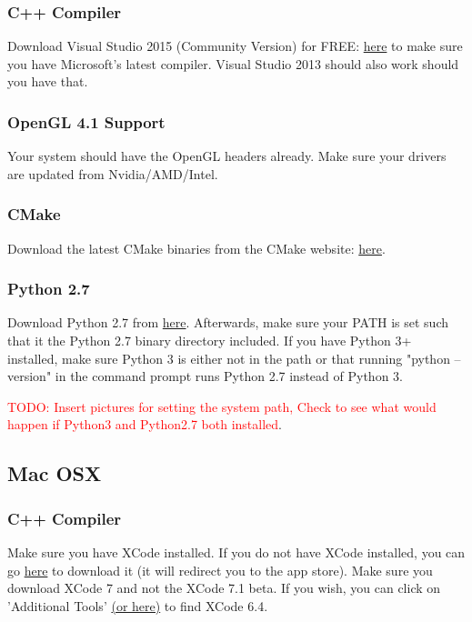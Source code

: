 \documentclass{article}
\begin{document}
\subsubsection*{C++ Compiler}

Download Visual Studio 2015 (Community Version) for FREE: \href{https://www.visualstudio.com/en-us/products/vs-2015-product-editions.aspx}{here} to make sure you have Microsoft's latest compiler.  Visual Studio 2013 should also work should you have that.

\subsubsection*{OpenGL 4.1 Support}

Your system should have the OpenGL headers already. Make sure your drivers are updated from Nvidia/AMD/Intel.

\subsubsection*{CMake}

Download the latest CMake binaries from the CMake website: \href{http://www.cmake.org/download/}{here}.

\subsubsection*{Python 2.7}

Download Python 2.7 from \href{https://www.python.org/download/releases/2.7/}{here}. Afterwards, make sure your PATH is set such that it the Python 2.7 binary directory included. If you have Python 3+ installed, make sure Python 3 is either not in the path or that running "python --version" in the command prompt runs Python 2.7 instead of Python 3.

\textcolor{red}{TODO: Insert pictures for setting the system path, Check to see what would happen if Python3 and Python2.7 both installed}.

\subsection*{Mac OSX}

\subsubsection*{C++ Compiler}

Make sure you have XCode installed. If you do not have XCode installed, you can go \href{https://developer.apple.com/xcode/download/}{here} to download it (it will redirect you to the app store). Make sure you download XCode 7 and not the XCode 7.1 beta. If you wish, you can click on 'Additional Tools' \href{https://developer.apple.com/downloads/}{(or here)} to find XCode 6.4.
\end{document}

